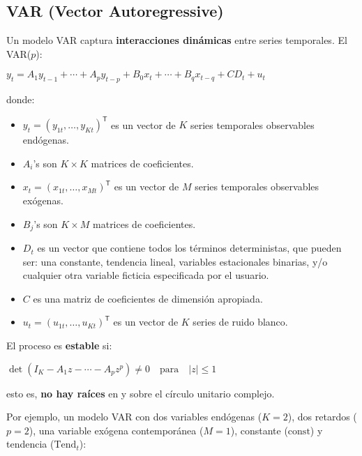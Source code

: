 \documentclass[10pt, a4paper, landscape]{extarticle}
\newcommand{\tr}{\mathsf{T}}
\begin{document}
\begin{multicols}{2}

\section*{VAR (Vector Autoregressive)}

Un modelo VAR captura \textbf{interacciones dinámicas} entre series temporales. El VAR($p$):

\begin{center}
	$y_t = A_1 y_{t - 1} + \cdots + A_p y_{t - p} + B_0 x_t + \cdots + B_q x_{t - q} + CD_t + u_t$
\end{center}

donde:

\begin{itemize}[leftmargin=*]
	\item $y_t = (y_{1t}, \ldots, y_{Kt})^\tr$ es un vector de $K$ series temporales observables endógenas.
	\item $A_i$'s son $K \times K$ matrices de coeficientes.
	\item $x_t = (x_{1t}, \ldots, x_{Mt})^\tr$ es un vector de $M$ series temporales observables exógenas.
	\item $B_j$'s son $K \times M$ matrices de coeficientes.
	\item $D_t$ es un vector que contiene todos los términos deterministas, que pueden ser: una constante, tendencia lineal, variables estacionales binarias, y/o cualquier otra variable ficticia especificada por el usuario.
	\item $C$ es una matriz de coeficientes de dimensión apropiada.
	\item $u_t = (u_{1t}, \ldots, u_{Kt})^\tr$ es un vector de $K$ series de ruido blanco.
\end{itemize}

El proceso es \textbf{estable} si:

\begin{center}
	$\det(I_K - A_1 z - \cdots - A_p z^p) \neq 0 \quad \mathrm{para} \quad \lvert z \rvert \leq 1$
\end{center}

\quad esto es, \textbf{no hay raíces} en y sobre el círculo unitario complejo.

Por ejemplo, un modelo VAR con dos variables endógenas ($K=2$), dos retardos ($p=2$), una variable exógena contemporánea ($M=1$), constante ($\mathrm{const}$) y tendencia ($\mathrm{Tend}_t$):


\end{multicols}
\end{document}
